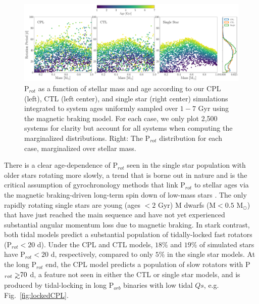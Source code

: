 \documentclass[twocolumn]{aastex61}
\def\gsim{~\rlap{$>$}{\lower 1.0ex\hbox{$\sim$}}}
\begin{document}



\begin{figure}[t]
	\includegraphics[width=\textwidth]{../Plots/protDist.pdf}
   \caption{P$_{rot}$ as a function of stellar mass and age according to our CPL (left), CTL (left center), and single star (right center) simulations integrated to system ages uniformly sampled over $1-7$ Gyr using the \citet{Matt2015} magnetic braking model. For each case, we only plot 2,500 systems for clarity but account for all systems when computing the marginalized distributions. Right: The P$_{rot}$ distribution for each case, marginalized over stellar mass.}%
    \label{fig:protDist}%
\end{figure}

There is a clear age-dependence of P$_{rot}$ seen in the single star population with older stars rotating more slowly, a trend that is borne out in nature and is the critical assumption of gyrochronology methods that link P$_{rot}$ to stellar ages via the magnetic braking-driven long-term spin down of low-mass stars \citep[e.g.][]{Skumanich1972,Barnes2003,Barnes2007,Mamajek2008,Barnes2010,Meibom2015}. The only rapidly rotating single stars are young (ages $< 2$ Gyr) M dwarfs (M$ < 0.5$ M$_{\odot}$) that have just reached the main sequence and have not yet experienced substantial angular momentum loss due to magnetic braking.  In stark contrast, both tidal models predict a substantial population of tidally-locked fast rotators (P$_{rot} < 20$ d). Under the CPL and CTL models, $18\%$ and $19\%$ of simulated stars have P$_{rot} < 20 $ d, respectively, compared to only $5\%$ in the single star models.  At the long P$_{rot}$ end, the CPL model predicts a population of slow rotators with P$_{rot} \gsim 70$ d, a feature not seen in either the CTL or single star models, and is produced by tidal-locking in long P$_{orb}$ binaries with low tidal $Qs$, e.g. Fig.~\ref{fig:lockedCPL}. 
\end{document}
